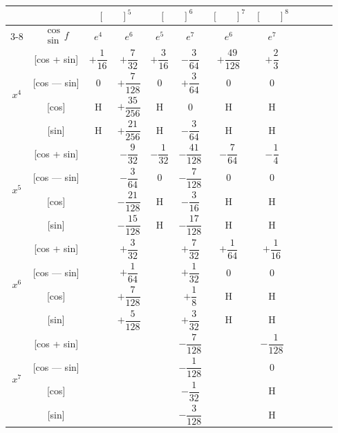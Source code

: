 \documentclass[11pt,a4paper]{book}
\begin{document}
{{\newpage


\begin{center}
\small
\begin{tabular}{|c|c|c|c|c|c|c|c|c|c|c|c|}
\hline
& & \multicolumn{2}{c|}{$[\phantom{()}]^5$} & \multicolumn{2}{c|}{$[\phantom{()}]^6$} & \multicolumn{1}{c|}{$[\phantom{()}]^7$} & \multicolumn{1}{c|}{$[\phantom{()}]^8$} \\
\cline{3-8}
& $\begin{smallmatrix} \cos \\ \sin \end{smallmatrix} f$ & $e^4$ & $e^6$ & $e^5$ & $e^7$ & $e^6$ & $e^7$ \\
\hline
\multirow{4}{*}{$x^4$} & [cos + sin] & $+\dfrac{1}{16}$ & $+\dfrac{7}{32}$ & $+\dfrac{3}{16}$ & $-\dfrac{3}{64}$ & $+\dfrac{49}{128}$ & $+\dfrac{2}{3}$ \\
& [cos --- sin] & $0$ & $+\dfrac{7}{128}$ & $0$ & $+\dfrac{3}{64}$ & $0$ & $0$ \\
& [cos] & H & $+\dfrac{35}{256}$ & H & $0$ & H & H \\
& [sin] & H & $+\dfrac{21}{256}$ & H & $-\dfrac{3}{64}$ & H & H \\
\hline
\multirow{4}{*}{$x^5$} & [cos + sin] & & $-\dfrac{9}{32}$ & $-\dfrac{1}{32}$ & $-\dfrac{41}{128}$ & $-\dfrac{7}{64}$ & $-\dfrac{1}{4}$ \\
& [cos --- sin] & & $-\dfrac{3}{64}$ & $0$ & $-\dfrac{7}{128}$ & $0$ & $0$ \\
& [cos] & & $-\dfrac{21}{128}$ & H & $-\dfrac{3}{16}$ & H & H \\
& [sin] & & $-\dfrac{15}{128}$ & H & $-\dfrac{17}{128}$ & H & H \\
\hline
\multirow{4}{*}{$x^6$} & [cos + sin] & & $+\dfrac{3}{32}$ & & $+\dfrac{7}{32}$ & $+\dfrac{1}{64}$ & $+\dfrac{1}{16}$ \\
& [cos --- sin] & & $+\dfrac{1}{64}$ & & $+\dfrac{1}{32}$ & $0$ & $0$ \\
& [cos] & & $+\dfrac{7}{128}$ & & $+\dfrac{1}{8}$ & H & H \\
& [sin] & & $+\dfrac{5}{128}$ & & $+\dfrac{3}{32}$ & H & H \\
\hline
\multirow{4}{*}{$x^7$} & [cos + sin] & & & & $-\dfrac{7}{128}$ & & $-\dfrac{1}{128}$ \\
& [cos --- sin] & & & & $-\dfrac{1}{128}$ & & $0$ \\
& [cos] & & & & $-\dfrac{1}{32}$ & & H \\
& [sin] & & & & $-\dfrac{3}{128}$ & & H \\
\hline
\end{tabular}
\end{center}

}}
\end{document}
